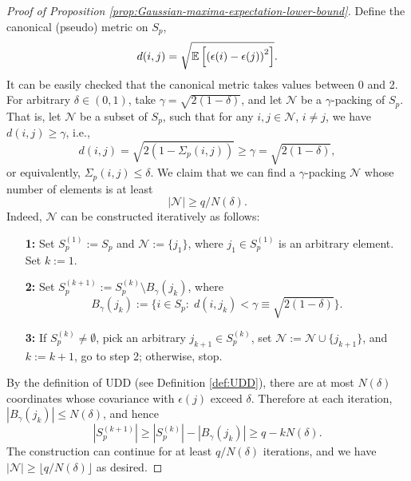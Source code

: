 \begin{proof}[Proof of Proposition \ref{prop:Gaussian-maxima-expectation-lower-bound}]
Define the canonical (pseudo) metric on $S_p$,
$$
d(i,j) = \sqrt{{\mathbb E}\left[\left(\epsilon(i)-\epsilon(j)\right)^2\right]}.
$$
It can be easily checked that the canonical metric takes values between 0 and 2.
For arbitrary $\delta\in(0,1)$, take $\gamma = \sqrt{2(1-\delta)}$, and
let $\mathcal{N}$ be a $\gamma$-packing of $S_p$. That is, let $\mathcal{N}$ be a subset of $S_p$, such that for any $i,j\in\mathcal{N}$, $i\neq j$, we have $d(i,j)\ge\gamma$, i.e.,
\begin{equation}\label{e:gamma-packing-def}
d(i,j) = \sqrt{2\left(1-\Sigma_p(i,j)\right)} \ge \gamma = \sqrt{2(1-\delta)},
\end{equation}
or equivalently, $\Sigma_p(i,j) \le \delta$.
We claim that we can find a $\gamma$-packing $\mathcal{N}$ whose number of elements is at least 
\begin{equation} \label{eq:packing-number-lower-bound}
    |\mathcal{N}| \ge q/N(\delta).
\end{equation}
Indeed, $\mathcal{N}$ can be constructed iteratively as follows:
\begin{itemize}    \raggedright
    \item[{\bf 1:}] Set $S_p^{(1)}:=S_p$ and $\mathcal{N}:=\{j_1\}$, where $j_1\in S_p^{(1)}$ is an arbitrary element. Set $k:=1$.\\
    \item[{\bf 2:}] Set $S_p^{(k+1)}:=S_p^{(k)}\setminus B_\gamma(j_k)$, where
    $$
    B_\gamma(j_k) := \{i\in S_p: \;d(i,j_k) < \gamma \equiv \sqrt{2(1-\delta)}\}.
    $$
    \item[{\bf 3:}] If $S_p^{(k)} \neq \emptyset$, pick an arbitrary $j_{k+1}\in S_p^{(k)}$, set $\mathcal{N}:=\mathcal{N}\cup\{j_{k+1}\}$, and $k:=k+1$, go to step 2; otherwise, stop.
\end{itemize}
By the definition of UDD (see Definition \ref{def:UDD}), there are at most $N(\delta)$ coordinates whose covariance with $\epsilon(j)$ exceed $\delta$. 
Therefore at each iteration, $\left|B_\gamma(j_k)\right|\le N(\delta)$, and hence
$$
\left|S_p^{(k+1)}\right| \ge \left|S_p^{(k)}\right| - \left| B_\gamma(j_k)\right| \ge q - kN(\delta).
$$
The construction can continue for at least $q/N(\delta)$ iterations, and we have $|\mathcal{N}| \ge \lfloor q/N(\delta) \rfloor$ as desired.
    

\end{proof}

